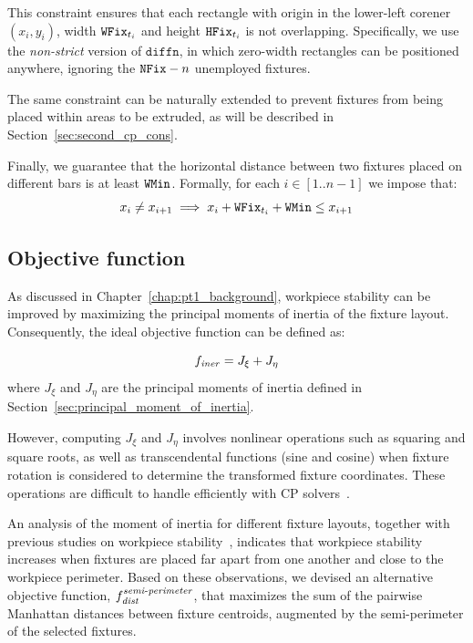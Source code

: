 This constraint ensures that each rectangle with origin in the lower-left corener $(x_i,y_i)$, width $\mathtt{WFix}_{t_i}$ and height $\mathtt{HFix}_{t_i}$ is not overlapping. Specifically, we use the \emph{non-strict} version of $\mathtt{diffn}$, in which zero-width rectangles can be positioned anywhere, ignoring the $\mathtt{NFix}{} - n$ unemployed fixtures.

The same constraint can be naturally extended to prevent fixtures from being placed within areas to be extruded, as will be described in Section~\ref{sec:second_cp_cons}.

Finally, we guarantee that the horizontal distance between two fixtures placed on different bars is at least $\mathtt{WMin}$. Formally, for each $i \in [1..n-1]$ we impose that:
$$x_{i} \neq x_{i+1} \implies x_{i} + \mathtt{WFix}_{t_{i}} + \mathtt{WMin} \leq x_{i+1}$$

\subsection{Objective function}
\label{sec:first_objective_function}
As discussed in Chapter~\ref{chap:pt1_background}, workpiece stability can be improved by maximizing the principal moments of inertia of the fixture layout. Consequently, the ideal objective function can be defined as:

\begin{equation}
	f_\mathit{iner} = J_\xi + J_\eta
	\label{eq:f_iner}
\end{equation}
where $J_\xi$ and $J_\eta$ are the principal moments of inertia defined in Section~\ref{sec:principal_moment_of_inertia}.

However, computing $J_\xi$ and $J_\eta$ involves nonlinear operations such as squaring and square roots, as well as transcendental functions (sine and cosine) when fixture rotation is considered to determine the transformed fixture coordinates. These operations are difficult to handle efficiently with CP solvers~\cite{leyffer2009applications}.

An analysis of the moment of inertia for different fixture layouts, together with previous studies on workpiece stability~\cite{kaya2006machining,roy1999geometric,menassa1991optimization,meyer1997fixture,wallack1997planning}, indicates that workpiece stability increases when fixtures are placed far apart from one another and close to the workpiece perimeter. Based on these observations, we devised an alternative objective function, $f_{\mathit{dist}}^{\mathit{semi\text{-}perimeter}}$, that maximizes the sum of the pairwise Manhattan distances between fixture centroids, augmented by the semi-perimeter of the selected fixtures.

